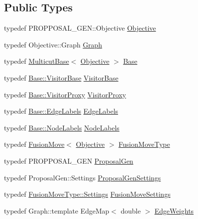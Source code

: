 \subsection*{Public Types}
\begin{DoxyCompactItemize}
\item 
typedef P\+R\+O\+P\+P\+O\+S\+A\+L\+\_\+\+G\+E\+N\+::\+Objective \hyperlink{classnifty_1_1graph_1_1FusionMoveBased_afe9396032c919255647c24b46a54bee4}{Objective}
\item 
typedef Objective\+::\+Graph \hyperlink{classnifty_1_1graph_1_1FusionMoveBased_a205de789ea5e0f76764b89abf2a49b3f}{Graph}
\item 
typedef \hyperlink{classnifty_1_1graph_1_1MulticutBase}{Multicut\+Base}$<$ \hyperlink{classnifty_1_1graph_1_1FusionMoveBased_afe9396032c919255647c24b46a54bee4}{Objective} $>$ \hyperlink{classnifty_1_1graph_1_1FusionMoveBased_ad0739c1f6bb9f1b4061ba683b06707b0}{Base}
\item 
typedef \hyperlink{classnifty_1_1graph_1_1MulticutBase_a5882fb69df59d8113f6a81a0dac26eaa}{Base\+::\+Visitor\+Base} \hyperlink{classnifty_1_1graph_1_1FusionMoveBased_a920e1485e8ab123a4e0ae0773870f4d9}{Visitor\+Base}
\item 
typedef \hyperlink{classnifty_1_1graph_1_1MulticutBase_a6ede271a3cb0ae4711a7e9da2b07efa9}{Base\+::\+Visitor\+Proxy} \hyperlink{classnifty_1_1graph_1_1FusionMoveBased_ade5cd053fae62b597daeaab5d830ade2}{Visitor\+Proxy}
\item 
typedef \hyperlink{classnifty_1_1graph_1_1MulticutBase_aaeefe3c5df81d9c9efffec878cf2fcd7}{Base\+::\+Edge\+Labels} \hyperlink{classnifty_1_1graph_1_1FusionMoveBased_a06b3870b5ac32bfd6cd197347f0563b7}{Edge\+Labels}
\item 
typedef \hyperlink{classnifty_1_1graph_1_1MulticutBase_afba61ad2919d0fad20b3745af19309da}{Base\+::\+Node\+Labels} \hyperlink{classnifty_1_1graph_1_1FusionMoveBased_a48c9960174a5a3e9c3bbe9756c7b4c22}{Node\+Labels}
\item 
typedef \hyperlink{classnifty_1_1graph_1_1FusionMove}{Fusion\+Move}$<$ \hyperlink{classnifty_1_1graph_1_1FusionMoveBased_afe9396032c919255647c24b46a54bee4}{Objective} $>$ \hyperlink{classnifty_1_1graph_1_1FusionMoveBased_a6b569b199cc2677d658972d5bcbf1922}{Fusion\+Move\+Type}
\item 
typedef P\+R\+O\+P\+P\+O\+S\+A\+L\+\_\+\+G\+E\+N \hyperlink{classnifty_1_1graph_1_1FusionMoveBased_a65248a923769ebcbad4d92ba2d2f2150}{Proposal\+Gen}
\item 
typedef Proposal\+Gen\+::\+Settings \hyperlink{classnifty_1_1graph_1_1FusionMoveBased_a397dcfd324df13f658f64519d1072685}{Proposal\+Gen\+Settings}
\item 
typedef \hyperlink{structnifty_1_1graph_1_1FusionMove_1_1Settings}{Fusion\+Move\+Type\+::\+Settings} \hyperlink{classnifty_1_1graph_1_1FusionMoveBased_aae91340fac92d40d69ab7526dd2b12ca}{Fusion\+Move\+Settings}
\item 
typedef Graph\+::template Edge\+Map$<$ double $>$ \hyperlink{classnifty_1_1graph_1_1FusionMoveBased_a650e7beea4f78efe543928dd00c1f713}{Edge\+Weights}
\end{DoxyCompactItemize}
